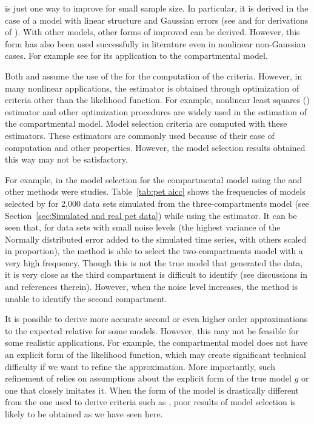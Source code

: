 \aicc is just one way to improve \aic for small sample size. In particular,
it is derived in the case of a model with linear structure and Gaussian
errors (see \cite{Hurvich:1989ev} and \cite[][sec.~6.4.1]{Burnham:2002wc} for
derivations of \aicc). With other models, other forms of improved \aic can be
derived. However, this form has also been used successfully in literature
even in nonlinear non-Gaussian cases. For example see
\cite{Turkheimer:2003iy} for its application to the \pet compartmental model.

Both \aic and \aicc assume the use of the \mle for the computation of the
criteria. However, in many nonlinear applications, the estimator is obtained
through optimization of criteria other than the likelihood function. For
example, nonlinear least squares (\nls) estimator and other optimization
procedures are widely used in the estimation of the \pet compartmental
model. Model selection criteria are computed with these estimators. These
estimators are commonly used because of their ease of computation and other
properties. However, the model selection results obtained this way may not be
satisfactory.

For example, in \cite{Zhou2013} the model selection for the \pet
compartmental model using the \aic and other methods were studies.
Table~\ref{tab:pet aicc} shows the frequencies of models selected by \aicc
for 2,000 data sets simulated from the three-compartments model (see
Section~\ref{sec:Simulated and real pet data}) while using the \nls
estimator. It can be seen that, for data sets with small noise levels (the
highest variance of the Normally distributed error added to the simulated
time series, with others scaled in proportion), the \aicc method is able to
select the two-compartments model with a very high frequency. Though this is
not the true model that generated the data, it is very close as the third
compartment is difficult to identify (see discussions in \cite{Zhou2013} and
references therein). However, when the noise level increases, the method is
unable to identify the second compartment.



It is possible to derive more accurate second or even higher order
approximations to the expected relative \kld for some models. However, this
may not be feasible for some realistic applications. For example, the \pet
compartmental model does not have an explicit form of the likelihood
function, which may create significant technical difficulty if we want to
refine the \aic approximation. More importantly, such refinement of \aic
relies on assumptions about the explicit form of the true model $g$ or one
that closely imitates it. When the form of the model is drastically different
from the one used to derive criteria such as \aicc, poor results of model
selection is likely to be obtained as we have seen here.

